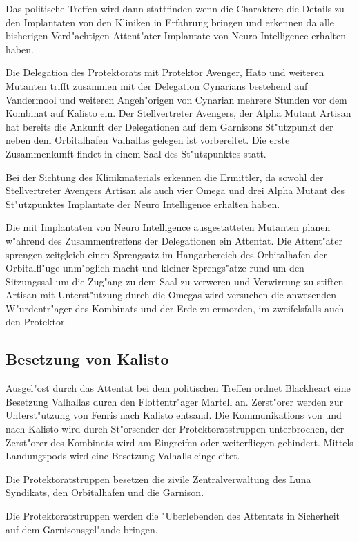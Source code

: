Das politische Treffen wird dann stattfinden wenn die Charaktere die Details zu den Implantaten von den Kliniken in
Erfahrung bringen und erkennen da\3 alle bisherigen Verd"achtigen Attent"ater Implantate von Neuro Intelligence
erhalten haben.

Die Delegation des Protektorats mit Protektor Avenger, Hato und weiteren Mutanten trifft zusammen mit der Delegation Cynarians bestehend auf Vandermool und weiteren Angeh"origen von Cynarian mehrere Stunden vor dem Kombinat auf Kalisto
ein. Der Stellvertreter Avengers, der Alpha Mutant Artisan hat bereits die Ankunft der Delegationen auf dem Garnisons St"utzpunkt der neben dem Orbitalhafen Valhallas gelegen ist vorbereitet. Die erste Zusammenkunft findet in einem Saal des St"utzpunktes statt.

Bei der Sichtung des Klinikmaterials erkennen die Ermittler, da\3 sowohl der Stellvertreter Avengers Artisan als auch vier Omega und drei Alpha Mutant des St"utzpunktes Implantate der Neuro Intelligence erhalten haben.

Die mit Implantaten von Neuro Intelligence ausgestatteten Mutanten planen w"ahrend des Zusammentreffens der Delegationen ein Attentat. Die Attent"ater sprengen zeitgleich einen Sprengsatz im Hangarbereich des Orbitalhafen der Orbitalfl"uge unm"oglich macht und kleiner Sprengs"atze rund um den Sitzungssal um die Zug"ang zu dem Saal zu verweren und Verwirrung zu stiften. Artisan mit Unterst"utzung durch die Omegas wird versuchen die anwesenden W"urdentr"ager des Kombinats und der Erde zu ermorden, im zweifelsfalls auch den Protektor.

\subsection{Besetzung von Kalisto}

Ausgel"ost durch das Attentat bei dem politischen Treffen ordnet Blackheart eine Besetzung Valhallas durch den Flottentr"ager Martell an. Zerst"orer werden zur Unterst"utzung von Fenris nach Kalisto entsand. Die Kommunikations von und nach Kalisto wird durch St"orsender der Protektoratstruppen unterbrochen, der Zerst"orer des Kombinats wird am Eingreifen oder weiterfliegen gehindert. Mittels Landungspods wird eine Besetzung Valhalls eingeleitet.

Die Protektoratstruppen besetzen die zivile Zentralverwaltung des Luna Syndikats, den Orbitalhafen und die Garnison.

Die Protektoratstruppen werden die "Uberlebenden des Attentats in Sicherheit auf dem Garnisonsgel"ande bringen.

